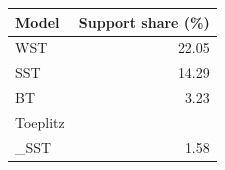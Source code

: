\begin{tabular}{lr}
\hline
Model & Support share (\%) \\
\hline
WST & 22.05 \\
SST & 14.29 \\
BT & 3.23 \\
Toeplitz\\_SST & 1.58 \\
\hline
\end{tabular}
